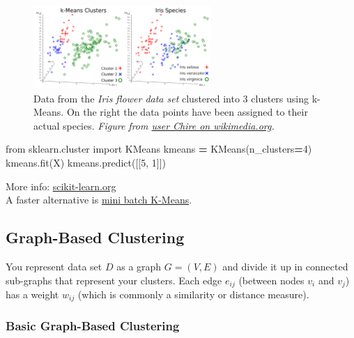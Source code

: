 \documentclass[
]{book}
\newenvironment{Shaded}{\begin{snugshade}}{\end{snugshade}}
\newcommand{\DecValTok}[1]{\textcolor[rgb]{0.00,0.00,0.81}{#1}}
\newcommand{\ImportTok}[1]{#1}
\newcommand{\NormalTok}[1]{#1}
\newcommand{\OperatorTok}[1]{\textcolor[rgb]{0.81,0.36,0.00}{\textbf{#1}}}
\begin{document}
\begin{figure}
\hypertarget{CDF}{%
\centering
\includegraphics[width=0.6\textwidth,height=\textheight]{./figures/kMeans.png}
\caption{Data from the \emph{Iris flower data set} clustered into 3 clusters using
k-Means. On the right the data points have been assigned to their actual
species. \emph{Figure from \href{https://commons.wikimedia.org/wiki/File:Autoencoder_schema.png}{user Chire on
wikimedia.org}.}}\label{CDF}
}
\end{figure}

\begin{Shaded}
\begin{Highlighting}[]
\ImportTok{from}\NormalTok{ sklearn.cluster }\ImportTok{import}\NormalTok{ KMeans}
\NormalTok{kmeans }\OperatorTok{=}\NormalTok{ KMeans(n\_clusters}\OperatorTok{=}\DecValTok{4}\NormalTok{)}
\NormalTok{kmeans.fit(X)}
\NormalTok{kmeans.predict([[}\DecValTok{5}\NormalTok{, }\DecValTok{1}\NormalTok{]])}
\end{Highlighting}
\end{Shaded}

More info:
\href{https://scikit-learn.org/stable/modules/generated/sklearn.cluster.KMeans.html}{scikit-learn.org}\\

A faster alternative is \href{https://scikit-learn.org/stable/modules/generated/sklearn.cluster.MiniBatchKMeans.html}{mini batch
K-Means}.

\hypertarget{graph-based-clustering}{%
\subsection{Graph-Based Clustering}\label{graph-based-clustering}}

You represent data set \(D\) as a graph \(G=(V,E)\) and divide it up in
connected sub-graphs that represent your clusters. Each edge \(e_{ij}\)
(between nodes \(v_i\) and \(v_j\)) has a weight \(w_{ij}\) (which is commonly
a similarity or distance measure).

\hypertarget{basic-graph-based-clustering}{%
\subsubsection{Basic Graph-Based Clustering}\label{basic-graph-based-clustering}}
\end{document}
